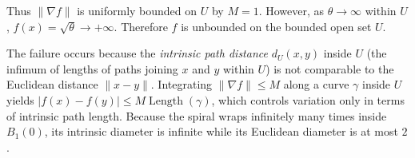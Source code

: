 \begin{exercisesolution}
\begin{enumerate}[label=\textbf{(\arabic*)}]
    Thus $\|\nabla f\|$ is uniformly bounded on $U$ by $M = 1$.
    However, as $\theta \to \infty$ within $U$, $f(x) = \sqrt{\theta} \to +\infty$. Therefore $f$ is unbounded on the bounded open set $U$.
\end{enumerate}
\begin{remark}
The failure occurs because the \emph{intrinsic path distance} $d_U(x, y)$ inside $U$ (the infimum of
lengths of paths joining $x$ and $y$ within $U$) is not comparable to the Euclidean distance $\|x - y\|$.
Integrating $\|\nabla f\| \leq M$ along a curve $\gamma$ inside $U$ yields $|f(x) - f(y)| \leq M \operatorname{Length}(\gamma)$,
which controls variation only in terms of intrinsic path length. Because the spiral wraps infinitely many times
inside $B_1(0)$, its intrinsic diameter is infinite while its Euclidean diameter is at most $2$.
\end{remark}
\end{exercisesolution}


